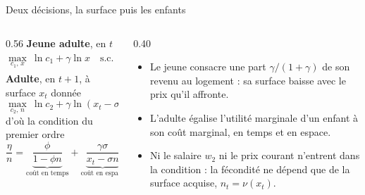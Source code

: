 \documentclass[10pt,aspectratio=169]{beamer}
\begin{document}
\begin{frame}{Deux décisions, la surface puis les enfants}
	\begin{columns}[T]
		\begin{column}{0.56\textwidth}
			\footnotesize
			{\color{tdtenavy}\bfseries Jeune adulte}, en $t$
			\[ \max_{c_1,\,x}\ \ln c_1 + \gamma\ln x \quad \text{s.c.} \quad c_1 + p_t x = w_1
			   \;\Longrightarrow\; x_t = \frac{\gamma\, w_1}{(1+\gamma)\, p_t} \]
			{\color{tdtenavy}\bfseries Adulte}, en $t+1$, à surface $x_t$ donnée
			\[ \max_{c_2,\,n}\ \ln c_2 + \gamma\ln(x_t-\sigma n) + \eta\ln n \quad \text{s.c.} \quad c_2 = w_2(1-\phi n) \]
			d'où la condition du premier ordre
			\[ \frac{\eta}{n} = \underbrace{\frac{\phi}{1-\phi n}}_{\text{coût en temps}}
			   + \underbrace{\frac{\gamma\sigma}{x_t-\sigma n}}_{\text{coût en espace}} \]
		\end{column}
		\begin{column}{0.40\textwidth}
			\small
			\begin{itemize}\setlength{\itemsep}{0.45em}
				\item Le jeune consacre une part $\gamma/(1+\gamma)$ de son revenu au logement : sa surface baisse avec le prix qu'il affronte.
				\item L'adulte égalise l'utilité marginale d'un enfant à son coût marginal, en temps et en espace.
				\item Ni le salaire $w_2$ ni le prix courant n'entrent dans la condition : la fécondité ne dépend que de la surface acquise, $n_t = \nu(x_t)$.
			\end{itemize}
		\end{column}
	\end{columns}
\end{frame}
\end{document}

